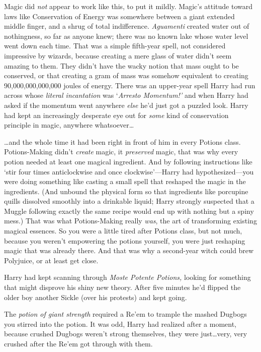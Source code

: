 Magic did \emph{not} appear to work like this, to put it mildly. Magic's attitude toward laws like Conservation of Energy was somewhere between a giant extended middle finger, and a shrug of total indifference. \emph{Aguamenti} created water out of nothingness, so far as anyone knew; there was no known lake whose water level went down each time. That was a simple fifth-year spell, not considered impressive by wizards, because creating a mere glass of water didn't seem amazing to them. They didn't have the wacky notion that mass ought to be conserved, or that creating a gram of mass was somehow equivalent to creating 90,000,000,000,000 joules of energy. There was an upper-year spell Harry had run across whose \emph{literal incantation} was `\emph{Arresto Momentum!'} and when Harry had asked if the momentum went anywhere \emph{else} he'd just got a puzzled look. Harry had kept an increasingly desperate eye out for \emph{some} kind of conservation principle in magic, anywhere whatsoever…

…and the whole time it had been right in front of him in every Potions class. Potions-Making didn't \emph{create} magic, it \emph{preserved} magic, that was why every potion needed at least one magical ingredient. And by following instructions like `stir four times anticlockwise and once clockwise'—Harry had hypothesized—you were doing something like casting a small spell that reshaped the magic in the ingredients. (And unbound the physical form so that ingredients like porcupine quills dissolved smoothly into a drinkable liquid; Harry strongly suspected that a Muggle following exactly the same recipe would end up with nothing but a spiny mess.) That was what Potions-Making really \emph{was}, the art of transforming existing magical essences. So you were a little tired after Potions class, but not much, because you weren't empowering the potions yourself, you were just reshaping magic that was already there. And that was why a second-year witch could brew Polyjuice, or at least get close.

Harry had kept scanning through \emph{Moste Potente Potions,} looking for something that might disprove his shiny new theory. After five minutes he'd flipped the older boy another Sickle (over his protests) and kept going.

The \emph{potion of giant strength} required a Re'em to trample the mashed Dugbogs you stirred into the potion. It was odd, Harry had realized after a moment, because crushed Dugbogs weren't strong themselves, they were just…very, very crushed after the Re'em got through with them.

